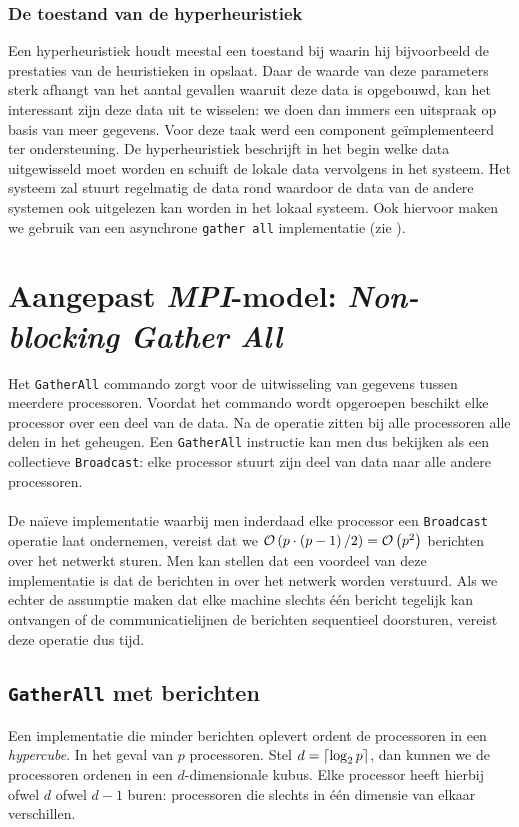 \subsubsection{De toestand van de hyperheuristiek}

Een hyperheuristiek houdt meestal een toestand bij waarin hij bijvoorbeeld de prestaties van de heuristieken in opslaat. Daar de waarde van deze parameters sterk afhangt van het aantal gevallen waaruit deze data is opgebouwd, kan het interessant zijn deze data uit te wisselen: we doen dan immers een uitspraak op basis van meer gegevens. Voor deze taak werd een component ge\"implementeerd ter ondersteuning. De hyperheuristiek beschrijft in het begin welke data uitgewisseld moet worden en schuift de lokale data vervolgens in het systeem. Het systeem zal stuurt regelmatig de data rond waardoor de data van de andere systemen ook uitgelezen kan worden in het lokaal systeem. Ook hiervoor maken we gebruik van een asynchrone \texttt{gather all} implementatie (zie ).

\section{Aangepast \emph{MPI}-model: \emph{Non-blocking Gather All}}

Het \texttt{GatherAll} commando zorgt voor de uitwisseling van gegevens tussen meerdere processoren. Voordat het commando wordt opgeroepen beschikt elke processor over een deel van de data. Na de operatie zitten bij alle processoren alle delen in het geheugen. Een \texttt{GatherAll} instructie kan men dus bekijken als een collectieve \texttt{Broadcast}: elke processor stuurt zijn deel van data naar alle andere processoren.

\paragraph{}De na\"ieve implementatie waarbij men inderdaad elke processor een \texttt{Broadcast} operatie laat ondernemen, vereist dat we $\mathcal{O}\left(p\cdot\left(p-1\right)/2\right)=\mathcal{O}\left(p^2\right)$ berichten over het netwerkt sturen. Men kan stellen dat een voordeel van deze implementatie is dat de berichten in  over het netwerk worden verstuurd. Als we echter de assumptie maken dat elke machine slechts \'e\'en bericht tegelijk kan ontvangen of de communicatielijnen de berichten sequentieel doorsturen, vereist deze operatie dus  tijd.

\subsection{\texttt{GatherAll} met  berichten}
Een implementatie die minder berichten oplevert ordent de processoren in een \emph{hypercube}\cite[algoritme 4.7]{books/bc/KumarGGK94}. In het geval van $p$ processoren. Stel $d=\left\lceil \log_2p\right\rceil$, dan kunnen we de processoren ordenen in een $d$-dimensionale kubus. Elke processor heeft hierbij ofwel $d$ ofwel $d-1$ buren: processoren die slechts in \'e\'en dimensie van elkaar verschillen.

